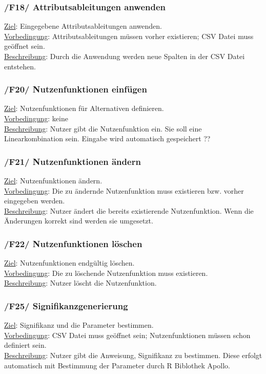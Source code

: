 \documentclass{article}
\begin{document}
\subsubsection*{/F18/ Attributsableitungen anwenden}
\underline{Ziel}: Eingegebene Attributsableitungen anwenden. \\
\underline{Vorbedingung}: Attributsableitungen müssen vorher existieren; CSV Datei muss geöffnet sein. \\
\underline{Beschreibung}: Durch die Anwendung werden neue Spalten in der CSV Datei entstehen.
\subsubsection*{/F20/ Nutzenfunktionen einfügen}
\underline{Ziel}: Nutzenfunktionen für Alternativen definieren. \\
\underline{Vorbedingung}: keine \\
\underline{Beschreibung}: Nutzer gibt die Nutzenfunktion ein. Sie soll eine Linearkombination sein. Eingabe wird automatisch gespeichert ?? \\
\subsubsection*{/F21/ Nutzenfunktionen ändern}
\underline{Ziel}: Nutzenfunktionen ändern.\\
\underline{Vorbedingung}: Die zu ändernde Nutzenfunktion muss existieren bzw. vorher eingegeben werden. \\
\underline{Beschreibung}: Nutzer ändert die bereits existierende Nutzenfunktion. Wenn die Änderungen korrekt sind werden sie umgesetzt.
\subsubsection*{/F22/ Nutzenfunktionen löschen}
\underline{Ziel}: Nutzenfunktionen endgültig löschen.\\
\underline{Vorbedingung}: Die zu löschende Nutzenfunktion muss existieren. \\
\underline{Beschreibung}: Nutzer löscht die Nutzenfunktion.
\subsubsection*{/F25/ Signifikanzgenerierung}
\underline{Ziel}: Signifikanz und die Parameter bestimmen. \\
\underline{Vorbedingung}: CSV Datei muss geöffnet sein; Nutzenfunktionen müssen schon definiert sein. \\
\underline{Beschreibung}: Nutzer gibt die Anweisung, Signifikanz zu bestimmen. Diese erfolgt automatisch mit Bestimmung der Parameter durch R Biblothek Apollo.
\end{document}
